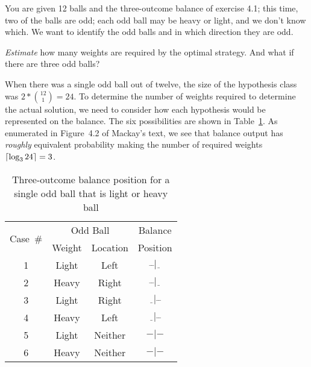 \begin{problem}{4}{14}
  You are given 12 balls and the three-outcome balance of exercise 4.1; this time, two of the balls are odd; each odd ball may be heavy or light, and we don't know which.  We want to identify the odd balls and in which direction they are odd.
\end{problem}



\begin{subproblem}
  \textit{Estimate} how many weights are required by the optimal strategy.  And what if there are three odd balls?
\end{subproblem}

  When there was a single odd ball out of twelve, the size of the hypothesis class was ${2 * \binom{12}{1} = 24}$.  To determine the number of weights required to determine the actual solution, we need to consider how each hypothesis would be represented on the balance.  The six possibilities are shown in Table~\ref{tab:p1OneBallTable}.  As enumerated in Figure~4.2 of Mackay's text, we see that balance output has \textit{roughly} equivalent probability making the number of required weights ${\lceil \log_{3} 24 \rceil=3}$.
  
  \begin{table}[H]
    \centering
    \caption{Three-outcome balance position for a \\single odd ball that is light or heavy ball}\label{tab:p1OneBallTable}
    \begin{tabular}{|c||c|c||c|}
      \hline
      \multirow{2}{*}{Case~\#} &  \multicolumn{2}{c||}{Odd Ball} & Balance\\\cline{2-3}
          &  Weight  &  Location &  Position  \\ \hline\hline
      1   &  Light   &  Left     &  $\bar{~}\bar{~}|\underline{~~}$ \\ \hline
      2   &  Heavy   &  Right    &  $\bar{~}\bar{~}|\underline{~~}$ \\ \hline\hline
      3   &  Light   &  Right    &  $\underline{~~}|\bar{~}\bar{~}$ \\ \hline
      4   &  Heavy   &  Left     &  $\underline{~~}|\bar{~}\bar{~}$ \\ \hline\hline
      5   &  Light   &  Neither  &  $-|-$ \\ \hline
      6   &  Heavy   &  Neither  &  $-|-$ \\ \hline
    \end{tabular}
  \end{table}

